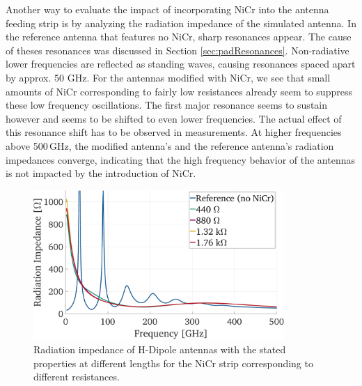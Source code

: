 Another way to evaluate the impact of incorporating NiCr into the antenna feeding strip is by analyzing the radiation impedance of the simulated antenna. In the reference antenna that features no NiCr, sharp resonances appear. The cause of theses resonances was discussed in Section \ref{sec:padResonances}. Non-radiative lower frequencies are reflected as standing waves, causing resonances spaced apart by approx. \num{50} \si{\giga \hertz}. For the antennas modified with NiCr, we see that small amounts of NiCr corresponding to fairly low resistances already seem to suppress these low frequency oscillations. The first major resonance seems to sustain however and seems to be shifted to even lower frequencies. The actual effect of this resonance shift has to be observed in measurements.  At higher frequencies above \num{500}\,\si{\giga \hertz}, the modified antenna's and the reference antenna's radiation impedances converge, indicating that the high frequency behavior of the antennas is not impacted by the introduction of NiCr. 


\begin{figure}[!]
    \centering
    \includegraphics[width=0.85\textwidth]{figures/radiation_imp.pdf}
    \caption{Radiation impedance of H-Dipole antennas with the stated properties at different lengths for the NiCr strip corresponding to different resistances.}
    \label{}
\end{figure}

